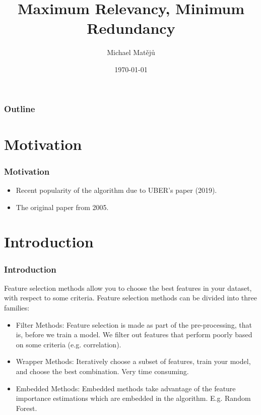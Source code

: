 \documentclass{beamer}
\title[MRMR]{Maximum Relevancy, Minimum Redundancy}
\author{Michael Mat\v{e}j\r{u}}
\institute[KB]{AI Squad}
\date{\today}
\begin{document}
    \begin{frame}
        \titlepage
    \end{frame}

    \begin{frame}
        \frametitle{Outline}
        \tableofcontents
    \end{frame}


    \section{Motivation}
    \begin{frame}
        \frametitle{Motivation}
        \begin{itemize}
            \item Recent popularity of the algorithm due to UBER's paper (2019).
            \item The original paper from 2005.
        \end{itemize}
    \end{frame}


    \section{Introduction}
    \begin{frame}
        \frametitle{Introduction}
        Feature selection methods allow you to choose the best features in your dataset, with
        respect to some criteria. Feature selection methods can be divided into three families:
        \pause
        \begin{itemize}
            \item Filter Methods: Feature selection is made as part of the pre-processing, that
            is, before we train a model. We filter out features that perform poorly based on some
            criteria (e.g. correlation).
            \pause
            \item Wrapper Methods: Iteratively choose a subset of features, train your model,
            and choose the best combination. Very time consuming.
            \pause
            \item Embedded Methods: Embedded methods take advantage of the feature importance
            estimations which are embedded in the algorithm. E.g. Random Forest.
        \end{itemize}
    \end{frame}
\end{document}
